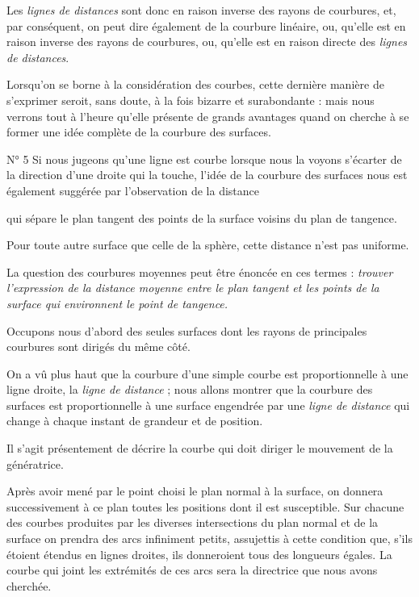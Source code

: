 \documentclass[11pt,a4paper]{article}
\begin{document}
Les \emph{lignes de distances} sont donc en raison inverse des rayons de
courbures, et, par conséquent, on peut dire également de la courbure
linéaire, ou, qu'elle est en raison inverse des rayons de courbures, ou,
qu'elle est en raison directe des \emph{lignes de distances}.

Lorsqu'on se borne à la considération des courbes, cette dernière manière de
s'exprimer seroit, sans doute, à la fois bizarre et surabondante : mais nous
verrons tout à l'heure qu'elle présente de grands avantages quand on cherche
à se former une idée complète de la courbure des surfaces.

N° 5 Si nous jugeons qu'une ligne est courbe lorsque nous la voyons s'écarter de
la direction d'une droite qui la touche, l'idée de la courbure des surfaces
nous est également suggérée par l'observation de la distance

qui sépare le plan tangent des points de la surface voisins du plan de
tangence.

Pour toute autre surface que celle de la sphère, cette distance n'est pas
uniforme.

La question des courbures moyennes peut être énoncée en ces termes :
\emph{trouver l'expression de la distance moyenne entre le plan tangent et
les points de la surface qui environnent le point de tangence.}


Occupons nous d'abord des seules surfaces dont les rayons de principales
courbures sont dirigés du même côté.

On a vû plus haut que la courbure d'une simple courbe est proportionnelle à
une ligne droite, la \emph{ligne de distance} ; nous allons montrer que la
courbure des surfaces est proportionnelle à une surface engendrée par une
\emph{ligne de distance} qui change à chaque instant de grandeur et de
position.

Il s'agit présentement de décrire la courbe qui doit diriger le mouvement de
la génératrice.

Après avoir mené par le point choisi le plan normal à la surface, on donnera
successivement à ce plan toutes les positions dont il est susceptible. Sur
chacune des courbes produites par les diverses intersections du plan normal
et de la surface on prendra des arcs infiniment petits, assujettis à cette
condition que, s'ils étoient étendus en lignes droites, ils donneroient tous
des longueurs égales. La courbe qui joint les extrémités de ces arcs sera la
directrice que nous avons cherchée.
\end{document}
